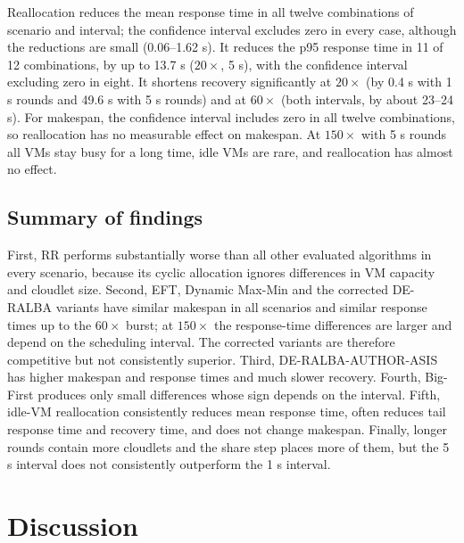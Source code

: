 \documentclass[default,sn-mathphys,Numbered]{sn-jnl}
\begin{document}
Reallocation reduces the mean response time in all twelve combinations of scenario and interval; the confidence interval excludes zero in every case, although the reductions are small (0.06--1.62 s). It reduces the p95 response time in 11 of 12 combinations, by up to 13.7 s ($20\times$, 5 s), with the confidence interval excluding zero in eight. It shortens recovery significantly at $20\times$ (by 0.4 s with 1 s rounds and 49.6 s with 5 s rounds) and at $60\times$ (both intervals, by about 23--24 s). For makespan, the confidence interval includes zero in all twelve combinations, so reallocation has no measurable effect on makespan. At $150\times$ with 5 s rounds all VMs stay busy for a long time, idle VMs are rare, and reallocation has almost no effect.

\subsection{Summary of findings}
First, RR performs substantially worse than all other evaluated algorithms in every scenario, because its cyclic allocation ignores differences in VM capacity and cloudlet size. Second, EFT, Dynamic Max-Min and the corrected DE-RALBA variants have similar makespan in all scenarios and similar response times up to the $60\times$ burst; at $150\times$ the response-time differences are larger and depend on the scheduling interval. The corrected variants are therefore competitive but not consistently superior. Third, DE-RALBA-AUTHOR-ASIS has higher makespan and response times and much slower recovery. Fourth, Big-First produces only small differences whose sign depends on the interval. Fifth, idle-VM reallocation consistently reduces mean response time, often reduces tail response time and recovery time, and does not change makespan. Finally, longer rounds contain more cloudlets and the share step places more of them, but the 5 s interval does not consistently outperform the 1 s interval.

\section{Discussion}\label{sec:discussion}
\end{document}
